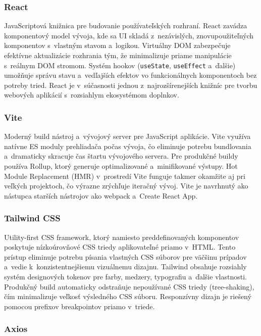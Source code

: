 \documentclass[a4paper, 12pt]{article}
\begin{document}
\subsubsection*{React}

JavaScriptová knižnica pre budovanie používateľských rozhraní. React zavádza komponentový model vývoja, kde sa UI skladá z~nezávislých, znovupoužiteľných komponentov s~vlastným stavom a~logikou. Virtuálny DOM zabezpečuje efektívne aktualizácie rozhrania tým, že minimalizuje priame manipulácie s~reálnym DOM stromom. Systém hookov (\texttt{useState}, \texttt{useEffect} a~ďalšie) umožňuje správu stavu a~vedľajších efektov vo funkcionálnych komponentoch bez potreby tried. React je v~súčasnosti jednou z~najrozšírenejších knižníc pre tvorbu webových aplikácií s~rozsiahlym ekosystémom doplnkov.

\subsubsection*{Vite}

Moderný build nástroj a~vývojový server pre JavaScript aplikácie. Vite využíva natívne ES moduly prehliadača počas vývoja, čo eliminuje potrebu bundlovania a~dramaticky skracuje čas štartu vývojového servera. Pre produkčné buildy používa Rollup, ktorý generuje optimalizované a~minifikované výstupy. Hot Module Replacement (HMR) v~prostredí Vite funguje takmer okamžite aj pri veľkých projektoch, čo výrazne zrýchľuje iteračný vývoj. Vite je navrhnutý ako nástupca starších nástrojov ako webpack a~Create React App.

\subsubsection*{Tailwind CSS}

Utility-first CSS framework, ktorý namiesto preddefinovaných komponentov poskytuje nízkoúrovňové CSS triedy aplikovateľné priamo v~HTML. Tento prístup eliminuje potrebu písania vlastných CSS súborov pre väčšinu prípadov a~vedie k~konzistentnejšiemu vizuálnemu dizajnu. Tailwind obsahuje rozsiahly systém designových tokenov pre farby, medzery, typografiu a~ďalšie vlastnosti. Produkčný build automaticky odstraňuje nepoužívané CSS triedy (tree-shaking), čím minimalizuje veľkosť výsledného CSS súboru. Responzívny dizajn je riešený pomocou prefixov breakpointov priamo v~triede.

\subsubsection*{Axios}
\end{document}
